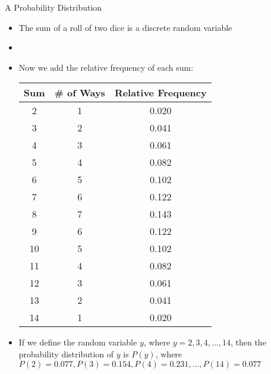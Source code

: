 \documentclass[xcolor=dvipsnames]{beamer}
\begin{document}
\begin{frame}{A Probability Distribution}
	\begin{itemize}
		\item The sum of a roll of two dice is a discrete random variable 
		\item[]
		\item Now we add the relative frequency of each sum:
		{ \tiny
			\begin{center}
				\begin{tabular}{|c|c|c|} \hline
					\textbf{Sum} & \textbf{\# of Ways} & Relative Frequency  \\ \hline \hline
					2 &    1 & 0.020 \\ \hline
					3  &   2 & 0.041\\ \hline
					4  &   3 &  0.061\\ \hline
					5  &   4 &   0.082\\ \hline
					6  &   5 & 0.102\\ \hline
					7  &   6 & 0.122\\ \hline
					8  &   7 & 0.143\\ \hline
					9  &   6 & 0.122\\ \hline
					10  &   5 & 0.102\\ \hline
					11  &   4 & 0.082\\ \hline
					12  &   3 & 0.061\\ \hline
					13  &   2 & 0.041\\ \hline
					14  &   1 &  0.020\\ \hline
				\end{tabular}
		\end{center}}
	\item If we define the random variable $y$, where $y = 2, 3, 4, \hdots, 14$, then the probability distribution of $y$ is $P(y)$, where $P(2) = 0.077, P(3) = 0.154, P(4) = 0.231, \hdots, P(14) = 0.077$ 
	\end{itemize}
\end{frame}
\end{document}
